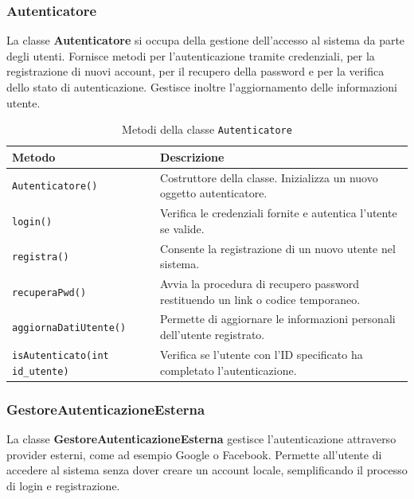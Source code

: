 \subsubsection{Autenticatore}

La classe \textbf{Autenticatore} si occupa della gestione dell’accesso al sistema da parte degli utenti. Fornisce metodi per l’autenticazione tramite credenziali, per la registrazione di nuovi account, per il recupero della password e per la verifica dello stato di autenticazione. Gestisce inoltre l’aggiornamento delle informazioni utente.

\begin{table}[H]
\centering
\begin{tabularx}{\textwidth}{|l|X|}
\hline
\textbf{Metodo} & \textbf{Descrizione} \\
\hline
\texttt{Autenticatore()} & Costruttore della classe. Inizializza un nuovo oggetto autenticatore. \\
\hline
\texttt{login()} & Verifica le credenziali fornite e autentica l’utente se valide. \\
\hline
\texttt{registra()} & Consente la registrazione di un nuovo utente nel sistema. \\
\hline
\texttt{recuperaPwd()} & Avvia la procedura di recupero password restituendo un link o codice temporaneo. \\
\hline
\texttt{aggiornaDatiUtente()} & Permette di aggiornare le informazioni personali dell’utente registrato. \\
\hline
\texttt{isAutenticato(int id\_utente)} & Verifica se l’utente con l’ID specificato ha completato l’autenticazione. \\
\hline
\end{tabularx}
\caption{Metodi della classe \texttt{Autenticatore}}
\end{table}

\subsubsection{GestoreAutenticazioneEsterna}

La classe \textbf{GestoreAutenticazioneEsterna} gestisce l’autenticazione attraverso provider esterni, come ad esempio Google o Facebook. Permette all’utente di accedere al sistema senza dover creare un account locale, semplificando il processo di login e registrazione. 

